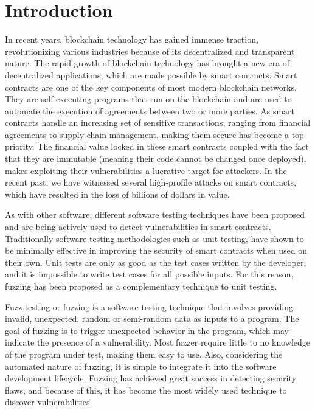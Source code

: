 
\chapter{Introduction}\label{chapter:introduction}
In recent years, blockchain technology has gained immense traction, revolutionizing various industries because of its decentralized and transparent nature.
The rapid growth of blockchain technology has brought a new era of decentralized applications, which are made possible by smart contracts.
Smart contracts are one of the key components of most modern blockchain networks.
They are self-executing programs that run on the blockchain and are used to automate the execution of agreements between two or more parties.
As smart contracts handle an increasing set of sensitive transactions, ranging from financial agreements to supply chain management, making them secure has become a top priority.
The financial value locked in these smart contracts coupled with the fact that they are immutable (meaning their code cannot be changed once deployed), makes exploiting their vulnerabilities a lucrative target for attackers.
In the recent past, we have witnessed several high-profile attacks on smart contracts, which have resulted in the loss of billions of dollars in value.

As with other software, different software testing techniques have been proposed and are being actively used to detect vulnerabilities in smart contracts.
Traditionally software testing methodologies such as unit testing, have shown to be minimally effective in improving the security of smart contracts when used on their own.
Unit tests are only as good as the test cases written by the developer, and it is impossible to write test cases for all possible inputs.
For this reason, fuzzing has been proposed as a complementary technique to unit testing.

Fuzz testing or fuzzing is a software testing technique that involves providing invalid, unexpected, random or semi-random data as inputs to a program.
The goal of fuzzing is to trigger unexpected behavior in the program, which may indicate the presence of a vulnerability.
Most fuzzer require little to no knowledge of the program under test, making them easy to use.
Also, considering the automated nature of fuzzing, it is simple to integrate it into the software development lifecycle.
Fuzzing has achieved great success in detecting security flaws, and because of this, it has become the most widely used technique to discover vulnerabilities.





